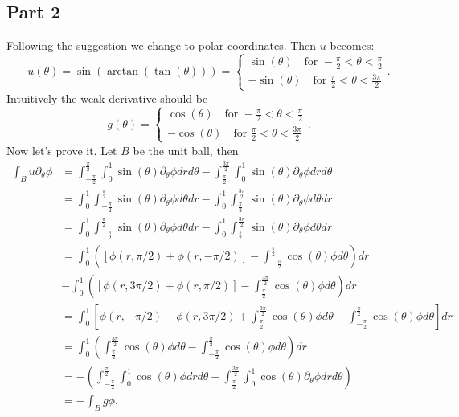 \documentclass{article}
\begin{document}
\subsection*{Part 2}
Following the suggestion we change to polar coordinates.
Then $u$ becomes:
\[
u(\theta)=\sin(\arctan(\tan(\theta)))=\begin{cases}
	\sin(\theta) \quad \text{for } -\frac{\pi}{2} < \theta < \frac{\pi}{2}\\
	-\sin(\theta) \quad \text{for } \frac{\pi}{2} < \theta < \frac{3\pi}{2}
\end{cases}.
\]
Intuitively the weak derivative should be
\[
g(\theta)=\begin{cases}
	\cos(\theta) \quad \text{for } -\frac{\pi}{2} < \theta < \frac{\pi}{2}\\
	-\cos(\theta) \quad \text{for } \frac{\pi}{2} < \theta < \frac{3\pi}{2}
\end{cases}.
\]
Now let's prove it. Let $B$ be the unit ball, then
\begin{align*}
	\int_{B}u\partial_{\theta}\phi &=\int_{-\frac{\pi}{2}}^{\frac{\pi}{2}} \int_0^1 \sin(\theta)\partial_\theta\phi drd\theta
		      -\int_{\frac{\pi}{2}}^{\frac{3\pi}{2}} \int_0^1 \sin(\theta)\partial_\theta\phi drd\theta\\
		      &=\int_0^1 \int_{-\frac{\pi}{2}}^{\frac{\pi}{2}} \sin(\theta)\partial_\theta\phi d\theta dr
		      -\int_0^1 \int_{\frac{\pi}{2}}^{\frac{3\pi}{2}} \sin(\theta)\partial_\theta\phi d\theta dr\\
		      &=\int_0^1 \int_{-\frac{\pi}{2}}^{\frac{\pi}{2}} \sin(\theta)\partial_\theta\phi d\theta dr
		      -\int_0^1 \int_{\frac{\pi}{2}}^{\frac{3\pi}{2}} \sin(\theta)\partial_\theta\phi d\theta dr\\
		      &=\int_0^1 \left( [\phi(r,\pi/2)+\phi(r,-\pi/2)]- \int_{-\frac{\pi}{2}}^{\frac{\pi}{2}} \cos(\theta)\phi d\theta \right) dr\\
		      &-\int_0^1 \left( [\phi(r,3\pi/2)+\phi(r,\pi/2)]- \int_{\frac{\pi}{2}}^{\frac{3\pi}{2}} \cos(\theta)\phi d\theta \right) dr\\
		      &=\int_0^1 \left[ \phi(r,-\pi/2)-\phi(r,3\pi/2) + \int_{\frac{\pi}{2}}^{\frac{3\pi}{2}} \cos(\theta)\phi d\theta - \int_{-\frac{\pi}{2}}^{\frac{\pi}{2}} \cos(\theta)\phi d\theta \right] dr\\
		      &=\int_0^1 \left(\int_{\frac{\pi}{2}}^{\frac{3\pi}{2}} \cos(\theta)\phi d\theta - \int_{-\frac{\pi}{2}}^{\frac{\pi}{2}} \cos(\theta)\phi d\theta \right) dr\\
		      &=-\left(\int_{-\frac{\pi}{2}}^{\frac{\pi}{2}} \int_0^1 \cos(\theta)\phi drd\theta
		        -\int_{\frac{\pi}{2}}^{\frac{3\pi}{2}} \int_0^1 \cos(\theta)\partial_\theta\phi drd\theta\right)\\
		      &=-\int_{B}g\phi.
\end{align*}
\end{document}
